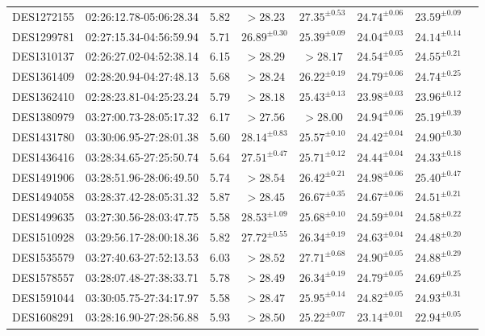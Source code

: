 {\begin{ThreePartTable}
\begin{longtable}{lccccccl}
DES1272155 & 02:26:12.78-05:06:28.34 & 5.82 & $> 28.23$ & $27.35^{ \pm 0.53}$ & $24.74^{ \pm 0.06}$ & $23.59^{ \pm 0.09}$ & \\
DES1299781 & 02:27:15.34-04:56:59.94 & 5.71 & $26.89^{ \pm 0.30}$ & $25.39^{ \pm 0.09}$ & $24.04^{ \pm 0.03}$ & $24.14^{ \pm 0.14}$ & \\
DES1310137 & 02:26:27.02-04:52:38.14 & 6.15 & $> 28.29$ & $> 28.17$ & $24.54^{ \pm 0.05}$ & $24.55^{ \pm 0.21}$ & \tnote{h} \\
DES1361409 & 02:28:20.94-04:27:48.13 & 5.68 & $> 28.24$ & $26.22^{ \pm 0.19}$ & $24.79^{ \pm 0.06}$ & $24.74^{ \pm 0.25}$ & \tnote{i} \\
DES1362410 & 02:28:23.81-04:25:23.24 & 5.79 & $> 28.18$ & $25.43^{ \pm 0.13}$ & $23.98^{ \pm 0.03}$ & $23.96^{ \pm 0.12}$ & \tnote{i} \\
DES1380979 & 03:27:00.73-28:05:17.32 & 6.17 & $> 27.56$ & $> 28.00$ & $24.94^{ \pm 0.06}$ & $25.19^{ \pm 0.39}$ & \\
DES1431780 & 03:30:06.95-27:28:01.38 & 5.60 & $28.14^{ \pm 0.83}$ & $25.57^{ \pm 0.10}$ & $24.42^{ \pm 0.04}$ & $24.90^{ \pm 0.30}$ & \tnote{d} \\
DES1436416 & 03:28:34.65-27:25:50.74 & 5.64 & $27.51^{ \pm 0.47}$ & $25.71^{ \pm 0.12}$ & $24.44^{ \pm 0.04}$ & $24.33^{ \pm 0.18}$ & \\
DES1491906 & 03:28:51.96-28:06:49.50 & 5.74 & $> 28.54$ & $26.42^{ \pm 0.21}$ & $24.98^{ \pm 0.06}$ & $25.40^{ \pm 0.47}$ & \\
DES1494058 & 03:28:37.42-28:05:31.32 & 5.87 & $> 28.45$ & $26.67^{ \pm 0.35}$ & $24.67^{ \pm 0.06}$ & $24.51^{ \pm 0.21}$ & \tnote{e} \\
DES1499635 & 03:27:30.56-28:03:47.75 & 5.58 & $28.53^{ \pm 1.09}$ & $25.68^{ \pm 0.10}$ & $24.59^{ \pm 0.04}$ & $24.58^{ \pm 0.22}$ & \\
DES1510928 & 03:29:56.17-28:00:18.36 & 5.82 & $27.72^{ \pm 0.55}$ & $26.34^{ \pm 0.19}$ & $24.63^{ \pm 0.04}$ & $24.48^{ \pm 0.20}$ & \\
DES1535579 & 03:27:40.63-27:52:13.53 & 6.03 & $> 28.52$ & $27.71^{ \pm 0.68}$ & $24.90^{ \pm 0.05}$ & $24.88^{ \pm 0.29}$ & \\
DES1578557 & 03:28:07.48-27:38:33.71 & 5.78 & $> 28.49$ & $26.34^{ \pm 0.19}$ & $24.79^{ \pm 0.05}$ & $24.69^{ \pm 0.25}$ & \\
DES1591044 & 03:30:05.75-27:34:17.97 & 5.58 & $> 28.47$ & $25.95^{ \pm 0.14}$ & $24.82^{ \pm 0.05}$ & $24.93^{ \pm 0.31}$ & \\
DES1608291 & 03:28:16.90-27:28:56.88 & 5.93 & $> 28.50$ & $25.22^{ \pm 0.07}$ & $23.14^{ \pm 0.01}$ & $22.94^{ \pm 0.05}$ & \\

\end{longtable}
\end{ThreePartTable}}
